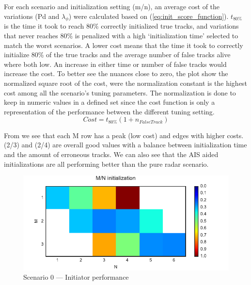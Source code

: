 For each scenario and initialization setting (m/n), an average cost of the variations (\gls{Pd} and \(\lambda_\phi \)) were calculated based on (\ref{eq:init_score_function}). \(t_{80\%}\) is the time it took to reach 80\% correctly initialized true tracks, and variations that never reaches 80\% is penalized with a high `initialization time' selected to match the worst scenarios. A lower cost means that the time it took to correctly initialize 80\% of the true tracks and the average number of false tracks alive where both low. An increase in either time or number of false tracks would increase the cost. To better see the nuances close to zero, the plot show the normalized square root of the cost, were the normalization constant is the highest cost among all the scenario's tuning parameters. The normalization is done to keep in numeric values in a defined set since the cost function is only a representation of the performance between the different tuning setting. 
\begin{equation}\label{eq:init_score_function}
Cost = t_{80\%} (1 + n_{False Track})
\end{equation}

From  we see that each M row has a peak (low cost) and edges with higher costs. (2/3) and (2/4) are overall good values with a balance between initialization time and the amount of erroneous tracks. We can also see that the AIS aided initializations are all performing better than the pure radar scenario. 
\begin{figure}
 \centering
 \includegraphics{Figures/plots/Scenario0_Init-Performance.pdf}
 \caption{Scenario 0 --- Initiator performance}\label{fig:init_performance_scenario0}
\end{figure}

